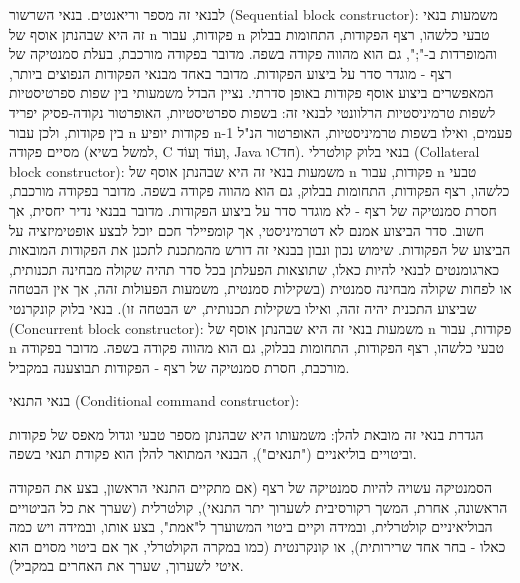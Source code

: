 \begin{טבלא}[!htbp]
        לבנאי זה מספר וריאנטים.
        בנאי השרשור (Sequential block constructor):
        משמעות בנאי זה היא שבהנתן אוסף של n פקודות, עבור n טבעי כלשהו, רצף הפקודות, התחומות בבלוק והמופרדות ב-";", גם הוא מהווה פקודה בשפה. מדובר בפקודה מורכבת, בעלת סמנטיקה של רצף - מוגדר סדר על ביצוע הפקודות.
        מדובר באחד מבנאי הפקודות הנפוצים ביותר, המאפשרים ביצוע אוסף פקודות באופן סדרתי. נציין הבדל משמעותי בין שפות ספרטיסטיות לשפות טרמיניסטיות הרלוונטי לבנאי זה: בשפות ספרטיסטיות, האופרטור נקודה-פסיק יפריד בין פקודות, ולכן עבור n פקודות יופיע n-1 פעמים, ואילו בשפות טרמיניסטיות, האופרטור הנ"ל מסיים פקודה (למשל בשיא, C וְעוֹד וְעוֹד, Java וCחד).
        בנאי בלוק קולטרלי (Collateral block constructor):
        משמעות בנאי זה היא שבהנתן אוסף של n פקודות, עבור n טבעי כלשהו, רצף הפקודות,
        התחומות בבלוק, גם הוא מהווה פקודה בשפה. מדובר בפקודה מורכבת, חסרת סמנטיקה של
        רצף - לא מוגדר סדר על ביצוע הפקודות. מדובר בבנאי נדיר יחסית, אך חשוב. סדר
        הביצוע אמנם לא דטרמיניסטי, אך קומפיילר חכם
        יוכל לבצע אופטימיזציה על הביצוע של הפקודות. שימוש נכון ונבון בבנאי זה דורש
        מהמתכנת לתכנן את הפקודות המובאות כארגומנטים לבנאי להיות כאלו, שתוצאות הפעלתן
        בכל סדר תהיה שקולה מבחינה תכנותית, או לפחות שקולה מבחינה סמנטית (בשקילות
        סמנטית, משמעות הפעולות זהה, אך אין הבטחה שביצוע התכנית יהיה זהה, ואילו בשקילות
        תכנותית, יש הבטחה זו). בנאי בלוק קונקרנטי (Concurrent block constructor):
        משמעות בנאי זה היא שבהנתן אוסף של n פקודות, עבור n טבעי כלשהו, רצף הפקודות, התחומות בבלוק, גם הוא מהווה פקודה בשפה. מדובר בפקודה מורכבת, חסרת סמנטיקה של רצף - הפקודות תבוצענה במקביל.

        בנאי התנאי (Conditional command constructor):

        הגדרת בנאי זה מובאת להלן:
        משמעותו היא שבהנתן מספר טבעי וגדול מאפס של פקודות וביטויים בוליאניים ("תנאים"), הבנאי המתואר להלן הוא פקודת תנאי בשפה.

        הסמנטיקה עשויה להיות סמנטיקה של רצף (אם מתקיים התנאי הראשון, בצע את הפקודה
        הראשונה, אחרת, המשך רקורסיבית לשערוך יתר התנאי), קולטרלית (שערך את כל הביטויים
        הבוליאיניים קולטרלית, ובמידה וקיים ביטוי המשוערך ל"אמת", בצע אותו, ובמידה ויש
        כמה כאלו - בחר אחד שרירותית), או קונקרנטית (כמו במקרה הקולטרלי, אך אם ביטוי
        מסוים הוא איטי לשערוך, שערך את האחרים במקביל).


\end{טבלא}
